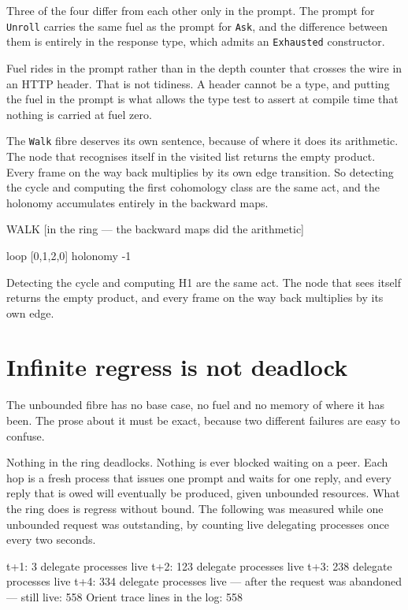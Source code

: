 \documentclass[11pt,a4paper]{article}
\begin{document}
Three of the four differ from each other only in the prompt. The prompt for
\verb|Unroll| carries the same fuel as the prompt for \verb|Ask|, and the difference
between them is entirely in the response type, which admits an \verb|Exhausted|
constructor.

Fuel rides in the prompt rather than in the depth counter that crosses the wire in an
HTTP header. That is not tidiness. A header cannot be a type, and putting the fuel in
the prompt is what allows the type test to assert at compile time that nothing is
carried at fuel zero.

The \verb|Walk| fibre deserves its own sentence, because of where it does its
arithmetic. The node that recognises itself in the visited list returns the empty
product. Every frame on the way back multiplies by its own edge transition. So
detecting the cycle and computing the first cohomology class are the same act, and
the holonomy accumulates entirely in the backward maps.

\begin{term}
  WALK   [in the ring — the backward maps did the arithmetic]

    loop        [0,1,2,0]
    holonomy    -1

    Detecting the cycle and computing H1 are the same act. The node
    that sees itself returns the empty product, and every frame on the
    way back multiplies by its own edge.
\end{term}

\section{Infinite regress is not deadlock}

The unbounded fibre has no base case, no fuel and no memory of where it has been. The
prose about it must be exact, because two different failures are easy to confuse.

Nothing in the ring deadlocks. Nothing is ever blocked waiting on a peer. Each hop is
a fresh process that issues one prompt and waits for one reply, and every reply that
is owed will eventually be produced, given unbounded resources. What the ring does is
regress without bound. The following was measured while one unbounded request was
outstanding, by counting live delegating processes once every two seconds.

\begin{term}
  t+1: 3 delegate processes live
  t+2: 123 delegate processes live
  t+3: 238 delegate processes live
  t+4: 334 delegate processes live
--- after the request was abandoned ---
  still live: 558
  Orient trace lines in the log: 558
\end{term}
\end{document}
